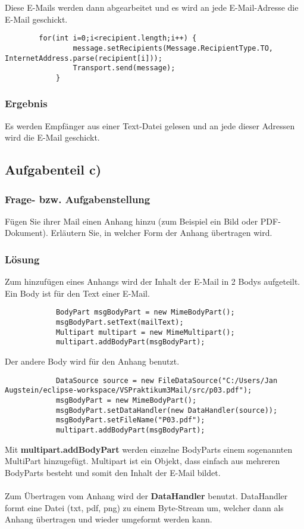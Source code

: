 Diese E-Mails werden dann abgearbeitet und es wird an jede E-Mail-Adresse die E-Mail geschickt.
\begin{lstlisting}
		for(int i=0;i<recipient.length;i++) {
				message.setRecipients(Message.RecipientType.TO, InternetAddress.parse(recipient[i]));
				Transport.send(message);
			}
\end{lstlisting}

\subsubsection{Ergebnis}
Es werden Empfänger aus einer Text-Datei gelesen und an jede dieser Adressen wird die E-Mail geschickt.

\subsection{Aufgabenteil c)}
\subsubsection{Frage- bzw. Aufgabenstellung}
 Fügen Sie ihrer Mail einen Anhang hinzu (zum Beispiel ein Bild oder PDF-Dokument). Erläutern Sie, in welcher Form der Anhang übertragen wird.

\subsubsection{Lösung}
Zum hinzufügen eines Anhangs wird der Inhalt der E-Mail in 2 Bodys aufgeteilt. Ein Body ist für den Text einer E-Mail.
\begin{lstlisting}
			BodyPart msgBodyPart = new MimeBodyPart();
			msgBodyPart.setText(mailText);
			Multipart multipart = new MimeMultipart();
			multipart.addBodyPart(msgBodyPart);
\end{lstlisting}


Der andere Body wird für den Anhang benutzt.
\begin{lstlisting}
			DataSource source = new FileDataSource("C:/Users/Jan Augstein/eclipse-workspace/VSPraktikum3Mail/src/p03.pdf");
			msgBodyPart = new MimeBodyPart();
			msgBodyPart.setDataHandler(new DataHandler(source));
			msgBodyPart.setFileName("P03.pdf");
			multipart.addBodyPart(msgBodyPart);
\end{lstlisting}

Mit \textbf{multipart.addBodyPart} werden einzelne BodyParts einem sogenannten MultiPart hinzugefügt. Multipart ist ein Objekt, dass einfach aus mehreren BodyParts besteht und somit den Inhalt der E-Mail bildet. \\
\\
Zum Übertragen vom Anhang wird der \textbf{DataHandler} benutzt. DataHandler formt eine Datei (txt, pdf, png) zu einem Byte-Stream um, welcher dann als Anhang übertragen und wieder umgeformt werden kann. \\

